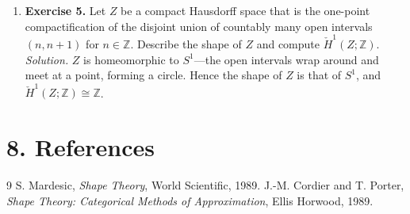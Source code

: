\begin{enumerate}[leftmargin=*,itemsep=0.9em]
\item \textbf{Exercise 5.} Let $Z$ be a compact Hausdorff space that is the one-point compactification of the disjoint union of countably many open intervals $(n,n+1)$ for $n\in\mathbb{Z}$. Describe the shape of $Z$ and compute $\check{H}^1(Z;\mathbb{Z})$. \emph{Solution.} $Z$ is homeomorphic to $S^1$---the open intervals wrap around and meet at a point, forming a circle. Hence the shape of $Z$ is that of $S^1$, and $\check{H}^1(Z;\mathbb{Z})\cong\mathbb{Z}$.

\end{enumerate}
\section*{8. References}
\begin{thebibliography}{9}
 S. Mardesic, \emph{Shape Theory}, World Scientific, 1989.
 J.-M. Cordier and T. Porter, \emph{Shape Theory: Categorical Methods of Approximation}, Ellis Horwood, 1989.
\end{thebibliography}
